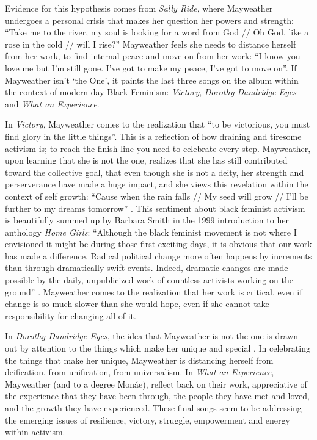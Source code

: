 \documentclass[a4paper, 11pt]{article} %
\begin{document}
Evidence for this hypothesis comes from \emph{Sally Ride}, where Mayweather undergoes a personal crisis that makes her question her powers and strength:
 ``Take me to the river, my soul is looking for a word from God // Oh God, like a rose in the cold // will I rise?'' \cite{sallyride}
Mayweather feels she needs to distance herself from her work, to find internal peace and move on from her work:
 ``I know you love me but I'm still gone. I've got to make my peace, I've got to move on''\cite{sallyride}.
 If Mayweather isn't `the One', it paints the last three songs on the album within the context of modern day Black Feminism: \emph{Victory}, \emph{Dorothy Dandridge Eyes} and \emph{What an Experience}.
 
 In \emph{Victory}, Mayweather comes to the realization that ``to be victorious, you must find glory in the little things''\cite{victory}.
This is a reflection of how draining and tiresome activism is; to reach the finish line you need to celebrate every step.
Mayweather, upon learning that she is not the one, realizes that she has still contributed toward the collective goal, that even though she is not a deity, her strength and perserverance have made a huge impact, and she views this revelation within the context of self growth: 
 ``Cause when the rain falls // My seed will grow // I'll be further to my dreams tomorrow'' \cite{victory}.
 This sentiment about black feminist activism is beautifully summed up by Barbara Smith in the 1999 introduction to her anthology \emph{Home Girls}:
 ``Although the black feminist movement is not where I envisioned it might be during those first exciting days, it is obvious that our work has made a difference. Radical political change more often happens by increments than through dramatically swift events. Indeed, dramatic changes are made possible by the daily, unpublicized work of countless activists working on the ground'' \cite{smithhomegirls}.
 Mayweather comes to the realization that her work is critical, even if change is so much slower than she would hope, even if she cannot take responsibility for changing all of it.
 
 In \emph{Dorothy Dandridge Eyes}, the idea that Mayweather is not the one is drawn out by attention to the things which make her unique and special \cite{dandridgeeyes}.
 In celebrating the things that make her unique, Mayweather is distancing herself from deification, from unification, from universalism.
 In \emph{What an Experience}, Mayweather (and to a degree Mon\'ae), reflect back on their work, appreciative of the experience that they have been through, the people they have met and loved, and the growth they have experienced. 
 These final songs seem to be addressing the emerging issues of resilience, victory, struggle, empowerment and energy within activism.
\end{document}
